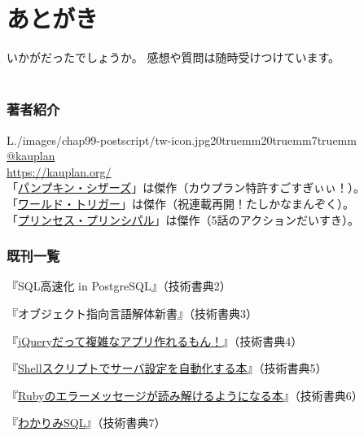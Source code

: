 \chapter{あとがき}
\label{chap:chap99-postscript}

いかがだったでしょうか。
感想や質問は随時受けつけています。
\\{}
\\{}

\subsection*{著者紹介}
\label{sec:-0-1}
{
  \def\starterminiimageframe{Y}
  \begin{startersideimage}{L}{./images/chap99-postscript/tw-icon.jpg}{20truemm}{20truemm}{7truemm}{}
\noindent
{}\\{}
\href{https://twitter.com/_kauplan/}{@\textunderscore{}kauplan}\\{}
\href{https://kauplan.org/}{https://kauplan.org/}\\{}
「\href{https://www.amazon.co.jp/dp/4063348792}{パンプキン・シザーズ}」は傑作（カウプラン特許すごすぎぃぃ！）。\\{}
「\href{http://worldtrigger.info/}{ワールド・トリガー}」は傑作（祝連載再開！たしかなまんぞく）。\\{}
「\href{https://pripri-anime.jp/}{プリンセス・プリンシパル}」は傑作（5話のアクションだいすき）。\\{}

  \end{startersideimage}
}
\vspace*{\baselineskip}

\subsection*{既刊一覧}
\label{sec:-0-2}

\begin{starteritemize}
\item 『SQL高速化 in PostgreSQL』（技術書典2）
\item 『オブジェクト指向言語解体新書』（技術書典3）
\item 『\href{https://kauplan.org/books/jquery/}{jQueryだって複雑なアプリ作れるもん！}』（技術書典4）
\item 『\href{https://kauplan.org/books/serversetup/}{Shellスクリプトでサーバ設定を自動化する本}』（技術書典5）
\item 『\href{https://kauplan.org/books/errmsg/}{Rubyのエラーメッセージが読み解けるようになる本}』（技術書典6）
\item 『\href{https://kauplan.org/books/sql/}{わかりみSQL}』（技術書典7）
\end{starteritemize}
